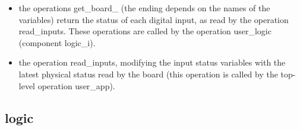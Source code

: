 \begin{itemize}    
    \item the operations get\_board\_ (the ending depends on the names of the variables) return the status of each digital input, as read by the operation read\_inputs. These operations are called by the operation user\_logic (component logic\_i).
\end{itemize}
 
\begin{itemize}
    \item the operation read\_inputs, modifying the input status variables with the latest physical status read by the board (this operation is called by the top-level operation user\_app).
\end{itemize}


\subsection{logic}


